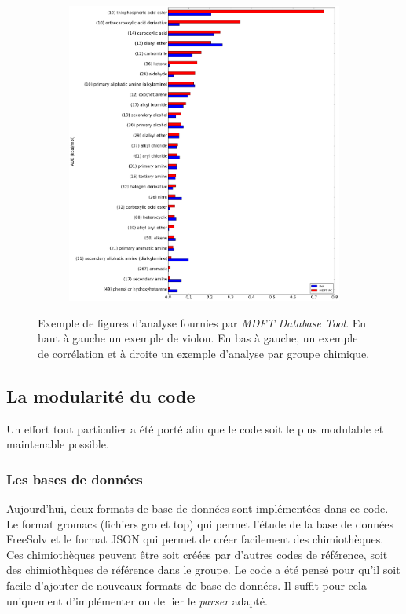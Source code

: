\begin{figure}[ht]
\begin{subfigure}[b]{0.40\textwidth}
   \end{subfigure}
   \hspace{5mm}
   \begin{subfigure}[b]{0.59\textwidth}
         \includegraphics[width=\textwidth]{chapters/BDD/images/freesolv_1/PC_error_by_groups.png}
    \end{subfigure}
  \caption[Exemple de figures d'analyse fournies par \textit{MDFT Database Tool}.]{Exemple de figures d'analyse fournies par \textit{MDFT Database Tool}. En haut à gauche un exemple de violon. En bas à gauche, un exemple de corrélation et à droite un exemple d'analyse par groupe chimique.}
  \label{fig:examples}
\end{figure}


\subsection{La modularité du code}
Un effort tout particulier a été porté afin que le code soit le plus modulable et maintenable possible. 

\subsubsection{Les bases de données}
Aujourd'hui, deux formats de base de données sont implémentées dans ce code. Le format gromacs (fichiers gro et top) qui permet l'étude de la base de données FreeSolv et le format JSON qui permet de créer facilement des chimiothèques. Ces chimiothèques peuvent être soit créées par d'autres codes de référence, soit des chimiothèques de référence dans le groupe. Le code a été pensé pour qu'il soit facile d'ajouter de nouveaux formats de base de données. Il suffit pour cela uniquement d'implémenter ou de lier le \textit{parser} adapté.

